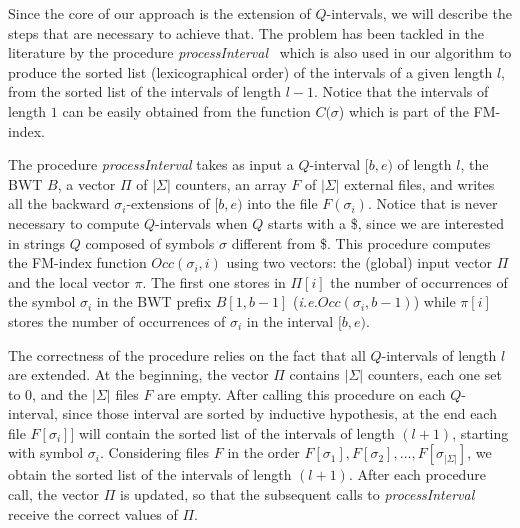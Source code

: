 \documentclass[runningheads,envcountsame,a4paper]{llncs}
\newcommand{\ie}{\textit{i.e.}\xspace}
\begin{document}
Since the core of our approach is the extension of $Q$-intervals, we will
describe the steps that are necessary to achieve that.
The problem has been tackled in the literature by
the procedure \emph{processInterval}~\cite{Cox2012} which is also used in our algorithm to produce the sorted list
(lexicographical order) of the intervals of a given length $l$, from the
sorted list of the intervals of length $l-1$. Notice that the intervals of length $1$
can be easily obtained from the  function $C(\sigma$) which is part of the FM-index.

The procedure \emph{processInterval} takes as input a $Q$-interval $[b,e)$ of
length $l$, the BWT $B$, a vector $\Pi$ of $|\Sigma|$ counters, an array $F$ of
$|\Sigma|$ external files, and writes all the backward $\sigma_i$-extensions of
$[b,e)$ into the file $F(\sigma_{i})$.
Notice that is never necessary to compute $Q$-intervals when $Q$ starts with a \$, since we are interested in strings $Q$ composed of symbols $\sigma$ different from \$.
This procedure computes the FM-index function $Occ(\sigma_i, i)$ using two
vectors: the (global) input vector $\Pi$ and the local vector $\pi$.
The first one stores in $\Pi[i]$ the number of occurrences of  the symbol
$\sigma_i$ in the BWT prefix $B[1,b-1]$ (\ie $Occ(\sigma_{i}, b-1)$) while
$\pi[i]$ stores the number of occurrences of $\sigma_i$ in the interval $[b,e)$.

The correctness of the procedure relies on the fact that all $Q$-intervals of
length $l$ are extended.
At the beginning, the vector $\Pi$ contains $|\Sigma|$ counters, each one set to $0$, and the $|\Sigma|$ files $F$ are empty.
After calling this procedure on each $Q$-interval, since those interval are
sorted by inductive hypothesis,  at the end each file $F[\sigma_{i}]]$ will
contain the sorted list of the intervals of length $(l+1)$, starting with symbol
$\sigma_i$.
Considering files $F$ in the order $F[\sigma_{1}], F[\sigma_{2}], \ldots
,F[\sigma_{|\Sigma|}]$, we obtain the sorted list of the intervals of length
$(l+1)$.
After each procedure call, the vector $\Pi$ is updated, so that the subsequent
calls to \emph{processInterval} receive the correct values of $\Pi$.
\end{document}
